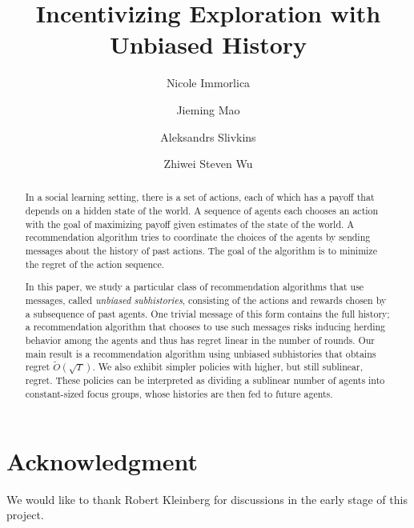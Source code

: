 \documentclass[11pt]{article}
\title{Incentivizing Exploration with Unbiased History}
\author{
Nicole Immorlica
\and
Jieming Mao
\and
Aleksandrs Slivkins
\and
Zhiwei Steven Wu
}
\begin{document}
\begin{titlepage}
\maketitle

\thispagestyle{empty}
\begin{abstract}
In a social learning setting, there is a set of actions, each of which has a payoff that depends on a hidden state of the world.  A sequence of agents each chooses an action with the goal of maximizing payoff given estimates of the state of the world.  A recommendation algorithm tries to coordinate the choices of the agents by sending messages about the history of past actions.  The goal of the algorithm is to minimize the regret of the action sequence.

In this paper, we study a particular class of recommendation algorithms that use messages, called {\em unbiased subhistories}, consisting of the actions and rewards chosen by a subsequence of past agents.  One trivial message of this form contains the full history; a recommendation algorithm that chooses to use such messages risks inducing herding behavior among the agents and thus has regret linear in the number of rounds.  Our main result is a recommendation algorithm using unbiased subhistories that obtains regret $\tilde{O}(\sqrt{T})$.  We also exhibit simpler policies with higher, but still sublinear, regret.  These policies can be interpreted as dividing a sublinear number of agents into constant-sized focus groups, whose histories are then fed to future agents.
\end{abstract}
\end{titlepage}




%










\section*{Acknowledgment}
We would like to thank Robert Kleinberg for discussions in the early stage of this project.

\appendix





%
\end{document}
